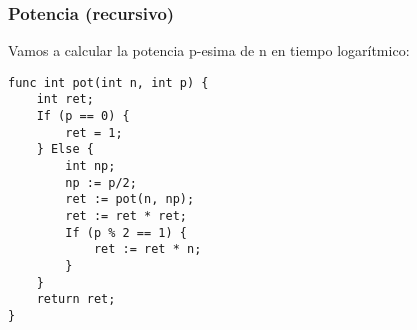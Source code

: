 \documentclass[spanish, a4paper, 12pt] {article}
\begin{document}
\subsubsection*{Potencia (recursivo)}
Vamos a calcular la potencia p-esima de n en tiempo logarítmico:
\begin{verbatim}
func int pot(int n, int p) {
    int ret;
    If (p == 0) {
        ret = 1;
    } Else {
        int np;
        np := p/2;
        ret := pot(n, np);
        ret := ret * ret;
        If (p % 2 == 1) {
            ret := ret * n;
        }
    }
    return ret;
}
\end{verbatim}
\end{document}
